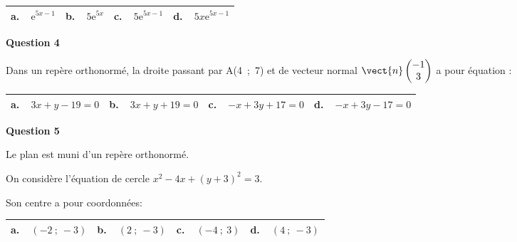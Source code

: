 \begin{center}
\begin{tabularx}{\linewidth}{|*{4}{X|}}\hline
\textbf{a.~~}$\text{e}^{5x- 1}$&\textbf{b.~~}$5\text{e}^{5x}$&\textbf{c.~~}$5\text{e}^{5x-1}$&\textbf{d.~~}$5x\text{e}^{5x- 1}$\\ \hline
\end{tabularx}
\end{center}

\medskip

\textbf{Question 4}

Dans un repère orthonormé, la droite passant par A(4~;~7) et de vecteur normal
$\vect{n}\begin{pmatrix}-1\\3\end{pmatrix}$ a pour équation :

\begin{center}
\begin{tabularx}{\linewidth}{|*{4}{X|}}\hline
\textbf{a.~~}$3x + y - 19 = 0$& \textbf{b.~~}$3x + y+ 19 = 0 $&\textbf{c.~~}$-x + 3y+ 17 = 0$&\textbf{d.~~}$-x + 3y- 17 = 0$\\ \hline
\end{tabularx}
\end{center}

\medskip

\textbf{Question 5}

Le plan est muni d'un repère orthonormé.

On considère l'équation de cercle $x^2 - 4x + (y + 3)^2 = 3$. 

Son centre a pour coordonnées: 

\begin{center}
\begin{tabularx}{\linewidth}{|*{4}{X|}}\hline
\textbf{a.~~}$(-2~;~-3)$& \textbf{b.~~}$(2~;~-3)$&\textbf{c.~~}$(-4~;~3)$&\textbf{d.~~}$(4~;~-3)$\\ \hline
\end{tabularx}
\end{center}

\bigskip
